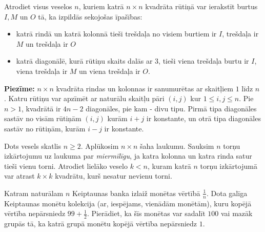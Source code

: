 \begin{problem}
Atrodiet visus veselos $n$, kuriem katrā $n \times n$ kvadrāta rūtiņā var ierakstīt burtus $I,M$ un $O$ tā, ka izpildās sekojošas īpašības:
\begin {itemize}
\item katrā rindā un katrā kolonnā tieši trešdaļa no visiem burtiem ir $I$, trešdaļa ir $M$ un trešdaļa ir $O$

\item katrā diagonālē, kurā rūtiņu skaits dalās ar $3$, tieši viena trešdaļa burtu ir $I$, viena trešdaļa ir $M$ un viena trešdaļa ir $O$.
\end {itemize}

\textbf{Piezīme:} $n \times n$ kvadrāta rindas un kolonnas ir sanumurētas ar skaitļiem $1$ līdz $n$ . Katru rūtiņu var apzīmēt ar naturālu skaitļu pāri $(i,j)$ kur $1 \le i,j \le n$. Pie $n>1$, kvadrātā ir $4n-2$ diagonāles, pie kam - divu tipu. Pirmā tipa diagonāles sastāv no visām rūtiņām $(i,j)$ kurām $i+j$ ir konstante, un otrā tipa diagonāles sastāv no rūtiņām, kurām $i-j$ ir konstante.


\end{problem}

\begin{problem}

Dots vesels skatlis $n\ge2$. Aplūkosim $n\times n$ šaha laukumu. Sauksim $n$ torņu izkārtojumu uz laukuma par \textit{miermīlīgu}, ja katra kolonna un katra rinda satur tieši vienu torni. Atrodiet lielāko veselo $k<n$, kuram katrā $n$ torņu izkārtojumā var atrast $k\times k$ kvadrātu, kurš nesatur nevienu torni.


\end{problem}

\begin{problem}

Katram naturālam $n$ Keiptaunas banka izlaiž monētas vērtībā  $\tfrac{1}{n}$. Dota galīga Keiptaunas monētu kolekcija (ar, iespējams, vienādām monētām), kuru kopējā vērtība nepārsniedz $99+\tfrac{1}{2}$. Pierādiet, ka šīs monētas var sadalīt $100$ vai mazāk grupās tā, ka katrā grupā monētu kopējā vērtība nepārsniedz $1$.
\end{problem}

%


